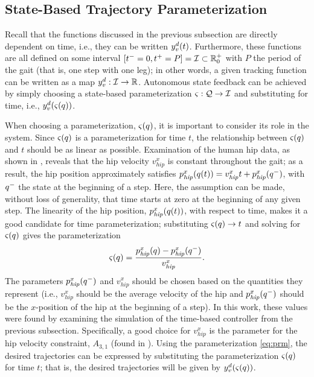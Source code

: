 \subsection{State-Based Trajectory Parameterization}

Recall that the functions discussed in the previous subsection are directly
dependent on time, i.e., they can be written $y_{v}^{d}(t)$.
%
Furthermore, these functions are all defined on some interval $[t^{-} = 0, t^{+}
= P] = \mathcal{I} \subset \mathbb{R}_{0}^{+}$ with $P$ the period of the gait (that is,
one step with one leg);
%
in other words, a given tracking function can be written as a map $y_{v}^{d} :
\mathcal{I} \to \mathbb{R}$.
%
Autonomous state feedback can be achieved by simply choosing a state-based
parameterization $\varsigma : \mathcal{Q} \to \mathcal{I}$ and substituting for time,
i.e., $y_{v}^{d}(\varsigma(q))$.

When choosing a parameterization, $\varsigma(q)$, it is important to consider
its role in the system.
%
Since $\varsigma(q)$ is a parameterization for time $t$, the relationship
between $\varsigma(q)$ and $t$ should be as linear as possible.
%
Examination of the human hip data, as shown in , reveals
that the hip velocity $v_{\mathit{hip}}^{x}$ is constant throughout the gait;
%
as a result, the hip position approximately satisfies
$p_{\mathit{hip}}^{x}(q(t)) = v_{\mathit{hip}}^x t + p_\mathit{hip}^x(q^{-})$,
with $q^{-}$ the state at the beginning of a step.
%
Here, the assumption can be made, without loss of generality, that time starts
at zero at the beginning of any given step.
%
The linearity of the hip position, $p_{\mathit{hip}}^{x}(q(t))$, with respect
to time, makes it a good candidate for time parameterization;
%
substituting $\varsigma(q) \to t$ and solving for $\varsigma(q)$ gives the
parameterization
\begin{align}
  \label{eq:prm}
  \varsigma(q) = \frac{p_{\mathit{hip}}^{x}(q) -
    p_{\mathit{hip}}^{x}(q^{-})}{v_{\mathit{hip}}^{x}}.
\end{align}
%
The parameters $p_{\mathit{hip}}^{x}(q^{-})$ and $v_{\mathit{hip}}^{x}$ should be
chosen based on the quantities they represent (i.e., $v_{\mathit{hip}}^{x}$
should be the average velocity of the hip and $p_{\mathit{hip}}^{x}(q^{-})$ should
be the $x$-position of the hip at the beginning of a step).
%
In this work, these values were found by examining the simulation of the
time-based controller from the previous subsection.
%
Specifically, a good choice for $v_{\mathit{hip}}^{x}$ is the parameter for the
hip velocity constraint, $A_{3,1}$ (found in ).
%
Using the parameterization \eqref{eq:prm}, the desired trajectories can be
expressed by substituting the parameterization $\varsigma(q)$ for time $t$;
%
that is, the desired trajectories will be given by
$y_{v}^{d}(\varsigma(q))$.


